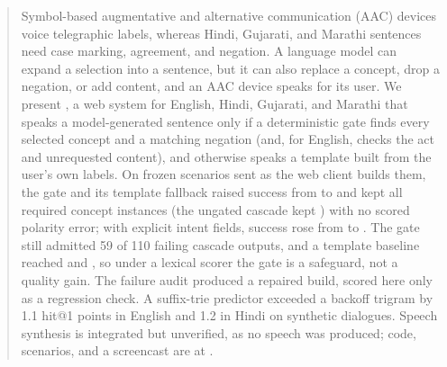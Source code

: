 \begin{abstract}
Symbol-based augmentative and alternative communication (AAC) devices voice telegraphic labels, whereas Hindi, Gujarati, and Marathi sentences need case marking, agreement, and negation.
A language model can expand a selection into a sentence, but it can also replace a concept, drop a negation, or add content, and an AAC device speaks for its user.
We present \sys{}, a web system for English, Hindi, Gujarati, and Marathi that speaks a model-generated sentence only if a deterministic gate finds every selected concept and a matching negation (and, for English, checks the act and unrequested content), and otherwise speaks a template built from the user's own labels.
On \NPrimAll{} frozen scenarios sent as the web client builds them, the gate and its template fallback raised success from \XPreUSuccPct{} to \XDepUSuccPct{} and kept all \NConc{} required concept instances (the ungated cascade kept \XPreUKept{}) with no scored polarity error; with explicit intent fields, success rose from \XPreSSuccPct{} to \XDepSSuccPct{}.
The gate still admitted 59 of 110 failing cascade outputs, and a template baseline reached \XTmplUSuccPct{} and \XTmplSSuccPct{}, so under a lexical scorer the gate is a safeguard, not a quality gain.
The failure audit produced a repaired build, scored here only as a regression check.
A suffix-trie predictor exceeded a backoff trigram by 1.1 hit@1 points in English and 1.2 in Hindi on synthetic dialogues.
Speech synthesis is integrated but unverified, as no speech was produced; code, scenarios, and a screencast are at \demourl{}.
\end{abstract}
